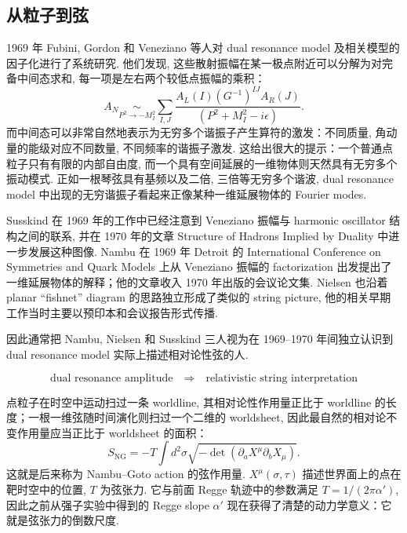 \documentclass[10pt]{article}
\newcounter{ex}[section]\setcounter{ex}{0}
\numberwithin{equation}{section}
\begin{document}
\subsection{从粒子到弦}

1969 年 Fubini, Gordon 和 Veneziano 等人对 dual resonance model 及相关模型的因子化进行了系统研究\cite{FubiniGordonVeneziano1969}. 他们发现, 这些散射振幅在某一极点附近可以分解为对完备中间态求和, 每一项是左右两个较低点振幅的乘积：
\begin{equation}\label{frac}
A_N\underset{P^2\to-M_I^2}{\sim}
\sum_{I,J} \frac{A_L(I)(G^{-1})^{IJ}A_R(J)}{(P^2+M_I^2-i\epsilon)}.
\end{equation}
而中间态可以非常自然地表示为无穷多个谐振子产生算符的激发：不同质量, 角动量的能级对应不同数量, 不同频率的谐振子激发. 这给出很大的提示：一个普通点粒子只有有限的内部自由度, 而一个具有空间延展的一维物体则天然具有无穷多个振动模式. 正如一根琴弦具有基频以及二倍, 三倍等无穷多个谐波, dual resonance model 中出现的无穷谐振子看起来正像某种一维延展物体的 Fourier modes. 

Susskind 在 1969 年的工作中已经注意到 Veneziano 振幅与 harmonic oscillator 结构之间的联系, 并在 1970 年的文章 Structure of Hadrons Implied by Duality 中进一步发展这种图像. Nambu 在 1969 年 Detroit 的 International Conference on Symmetries and Quark Models 上从 Veneziano 振幅的 factorization 出发提出了一维延展物体的解释；他的文章收入 1970 年出版的会议论文集. Nielsen 也沿着 planar “fishnet” diagram 的思路独立形成了类似的 string picture, 他的相关早期工作当时主要以预印本和会议报告形式传播. 

因此通常把 Nambu, Nielsen 和 Susskind 三人视为在 1969–1970 年间独立认识到 dual resonance model 实际上描述相对论性弦的人\cite{Susskind1970,CappelliEtAl2012}. 

\begin{equation}
\text{dual resonance amplitude}
\quad\Longrightarrow\quad
\text{relativistic string interpretation}
\end{equation}

点粒子在时空中运动扫过一条 worldline, 其相对论性作用量正比于 worldline 的长度；一根一维弦随时间演化则扫过一个二维的 worldsheet, 因此最自然的相对论不变作用量应当正比于 worldsheet 的面积：
\begin{equation} 
S_{\mathrm{NG}}=-T\int d^2\sigma\sqrt{-\det\left (\partial_aX^\mu\partial_bX_\mu\right)}.
\end{equation}
这就是后来称为 Nambu–Goto action 的弦作用量. $X^\mu(\sigma,\tau)$ 描述世界面上的点在靶时空中的位置, $T$ 为弦张力. 它与前面 Regge 轨迹中的参数满足 $T=1/(2\pi\alpha')$, 因此之前从强子实验中得到的 Regge slope $\alpha'$ 现在获得了清楚的动力学意义：它就是弦张力的倒数尺度. 
\end{document}
